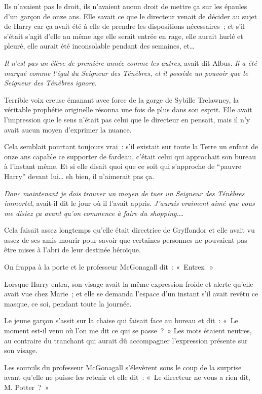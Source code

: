 Ils n'avaient pas le droit, ils n'avaient aucun droit de mettre ça sur les épaules d'un garçon de onze ans. Elle savait ce que le directeur venait de décider au sujet de Harry car ça avait été à elle de prendre les dispositions nécessaires~; et s'il s'était s'agit d'elle au même age elle serait entrée en rage, elle aurait hurlé et pleuré, elle aurait été inconsolable pendant des semaines, et…

\emph{Il n'est pas un élève de première année comme les autres}, avait dit Albus. \emph{Il a été marqué comme l'égal du Seigneur des Ténèbres, et il possède un pouvoir que le Seigneur des Ténèbres ignore.}

Terrible voix creuse émanant avec force de la gorge de Sybille Trelawney, la véritable prophétie originelle résonna une fois de plus dans son esprit. Elle avait l'impression que le sens n'était pas celui que le directeur en pensait, mais il n’y avait aucun moyen d'exprimer la nuance.

Cela semblait pourtant toujours vrai~: s'il existait sur toute la Terre un enfant de onze ans capable ce supporter de fardeau, c'était celui qui approchait son bureau à l'instant même. Et si elle disait quoi que ce soit qui s'approche de “pauvre Harry” devant lui… eh bien, il n'aimerait pas ça.

\emph{Donc maintenant je dois trouver un moyen de tuer un Seigneur des Ténèbres immortel}, avait-il dit le jour où il l'avait appris. \emph{J'aurais vraiment aimé que vous me disiez ça avant qu'on commence à faire du shopping.}…

Cela faisait assez longtemps qu'elle était directrice de Gryffondor et elle avait vu assez de ses amis mourir pour savoir que certaines personnes ne pouvaient pas être mises à l'abri de leur destinée héroïque.

On frappa à la porte et le professeur McGonagall dit~: «~Entrez.~»

Lorsque Harry entra, son visage avait la même expression froide et alerte qu'elle avait vue chez Marie~; et elle se demanda l'espace d'un instant s'il avait revêtu ce masque, ce soi, pendant toute la journée.

Le jeune garçon s'assit sur la chaise qui faisait face au bureau et dit~: «~Le moment est-il venu où l'on me dit ce qui se passe~?~» Les mots étaient neutres, au contraire du tranchant qui aurait dû accompagner l'expression présente sur son visage.

Les sourcils du professeur McGonagall s'élevèrent sous le coup de la surprise avant qu'elle ne puisse les retenir et elle dit~: «~Le directeur ne vous a rien dit, M. Potter~?~»

